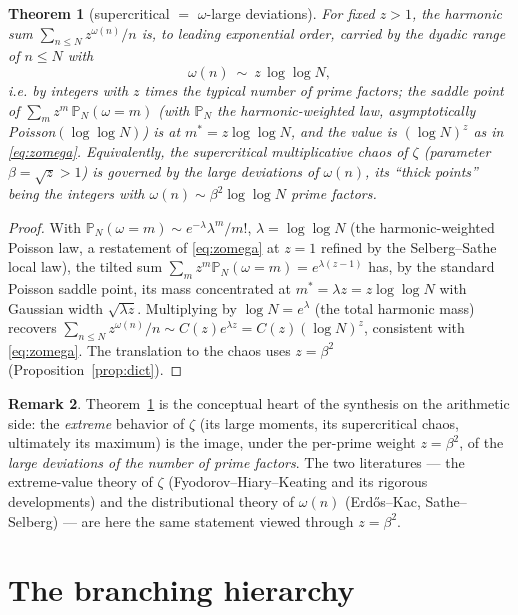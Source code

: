 \documentclass[11pt]{amsart}
\newtheorem{theorem}{Theorem}[section]
\theoremstyle{definition}
\newtheorem{remark}[theorem]{Remark}
\newcommand{\Pp}{\mathbb P}
\newcommand{\loglog}{\log\log}
\begin{document}
\begin{theorem}[supercritical $=$ $\omega$-large deviations]\label{thm:ld}
For fixed $z>1$, the harmonic sum $\sum_{n\le N}z^{\omega(n)}/n$ is, to leading exponential order, carried by the
dyadic range of $n\le N$ with
\[
\omega(n)\ \sim\ z\,\loglog N,
\]
i.e. by integers with $z$ times the typical number of prime factors; the saddle point of
$\sum_m z^m\,\Pp_N(\omega=m)$ (with $\Pp_N$ the harmonic-weighted law, asymptotically Poisson$(\loglog N)$) is at
$m^\ast=z\loglog N$, and the value is $(\log N)^{z}$ as in \eqref{eq:zomega}. Equivalently, the supercritical
multiplicative chaos of $\zeta$ (parameter $\beta=\sqrt z>1$) is governed by the large deviations of $\omega(n)$,
its ``thick points'' being the integers with $\omega(n)\sim\beta^2\loglog N$ prime factors.
\end{theorem}
\begin{proof}
With $\Pp_N(\omega=m)\sim e^{-\lambda}\lambda^{m}/m!$, $\lambda=\loglog N$ (the harmonic-weighted Poisson law,
a restatement of \eqref{eq:zomega} at $z=1$ refined by the Selberg--Sathe local law), the tilted sum
$\sum_m z^m\Pp_N(\omega=m)=e^{\lambda(z-1)}$ has, by the standard Poisson saddle point, its mass concentrated at
$m^\ast=\lambda z=z\loglog N$ with Gaussian width $\sqrt{\lambda z}$. Multiplying by $\log N=e^{\lambda}$ (the
total harmonic mass) recovers $\sum_{n\le N}z^{\omega(n)}/n\sim C(z)e^{\lambda z}=C(z)(\log N)^{z}$, consistent
with \eqref{eq:zomega}. The translation to the chaos uses $z=\beta^2$ (Proposition~\ref{prop:dict}).
\end{proof}

\begin{remark}
Theorem~\ref{thm:ld} is the conceptual heart of the synthesis on the arithmetic side: the \emph{extreme} behavior
of $\zeta$ (its large moments, its supercritical chaos, ultimately its maximum) is the image, under the per-prime
weight $z=\beta^2$, of the \emph{large deviations of the number of prime factors}. The two literatures --- the
extreme-value theory of $\zeta$ (Fyodorov--Hiary--Keating and its rigorous developments) and the distributional
theory of $\omega(n)$ (Erd\H{o}s--Kac, Sathe--Selberg) --- are here the same statement viewed through $z=\beta^2$.
\end{remark}

\section{The branching hierarchy}\label{sec:branch}
\end{document}
